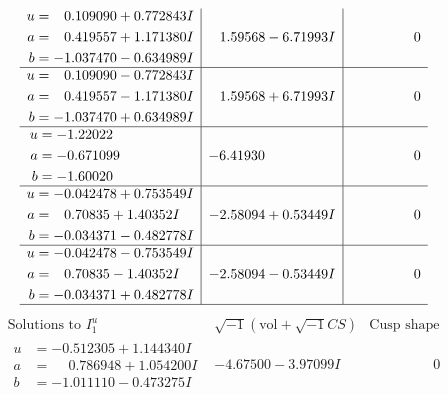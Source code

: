 \documentclass[1p]{elsarticle_modified}
\theoremstyle{definition}
\newcommand{\I}{\sqrt{-1}}
\begin{document}
$$\begin{array}{c|c|c}
\begin{aligned}
u &= \phantom{-}0.109090 + 0.772843 I \\
a &= \phantom{-}0.419557 + 1.171380 I \\
b &= -1.037470 - 0.634989 I\end{aligned}
 & \phantom{-}1.59568 - 6.71993 I & \phantom{-0.000000 } 0 \\ \hline\begin{aligned}
u &= \phantom{-}0.109090 - 0.772843 I \\
a &= \phantom{-}0.419557 - 1.171380 I \\
b &= -1.037470 + 0.634989 I\end{aligned}
 & \phantom{-}1.59568 + 6.71993 I & \phantom{-0.000000 } 0 \\ \hline\begin{aligned}
u &= -1.22022\phantom{ +0.000000I} \\
a &= -0.671099\phantom{ +0.000000I} \\
b &= -1.60020\phantom{ +0.000000I}\end{aligned}
 & -6.41930\phantom{ +0.000000I} & \phantom{-0.000000 } 0 \\ \hline\begin{aligned}
u &= -0.042478 + 0.753549 I \\
a &= \phantom{-}0.70835 + 1.40352 I \\
b &= -0.034371 - 0.482778 I\end{aligned}
 & -2.58094 + 0.53449 I & \phantom{-0.000000 } 0 \\ \hline\begin{aligned}
u &= -0.042478 - 0.753549 I \\
a &= \phantom{-}0.70835 - 1.40352 I \\
b &= -0.034371 + 0.482778 I\end{aligned}
 & -2.58094 - 0.53449 I & \phantom{-0.000000 } 0\\
 \hline 
 \end{array}$$\newpage$$\begin{array}{c|c|c}  
\text{Solutions to }I^u_{1}& \I (\text{vol} + \sqrt{-1}CS) & \text{Cusp shape}\\
 \hline 
\begin{aligned}
u &= -0.512305 + 1.144340 I \\
a &= \phantom{-}0.786948 + 1.054200 I \\
b &= -1.011110 - 0.473275 I\end{aligned}
 & -4.67500 - 3.97099 I & \phantom{-0.000000 } 0 \\ \hline\begin{aligned}

\end{aligned}
\end{array}$$
\end{document}
